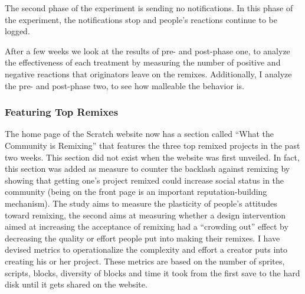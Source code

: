 The second phase of the experiment is sending no notifications. In this phase of the experiment, the notifications stop and people's reactions continue to be logged.

After a few weeks we look at the results of pre- and post-phase one, to analyze the effectiveness of each treatment by measuring the number of positive and negative reactions that originators leave on the remixes. 
Additionally, I analyze the pre- and post-phase two, to see how malleable the behavior is.

\subsubsection{Featuring Top Remixes}
The home page of the Scratch website now has a section called ``What the Community is Remixing''  that features the three top remixed projects in the past two weeks.
This section did not exist when the website was first unveiled.
In fact, this section was added as measure to counter the backlash against remixing by showing that getting one's project remixed could increase social status in the community (being on the front page is an important reputation-building mechanism).
The study aims to measure the plasticity of people's attitudes toward remixing, the second aims at measuring whether a design intervention aimed at increasing the acceptance of remixing had a ``crowding out'' effect by decreasing the quality or effort people put into making their remixes.
I have devised metrics to operationalize the complexity and effort a creator puts into creating his or her project. These metrics are based on the number of sprites, scripts, blocks, diversity of blocks and time it took from the first save to the hard disk until it gets shared on the website.

